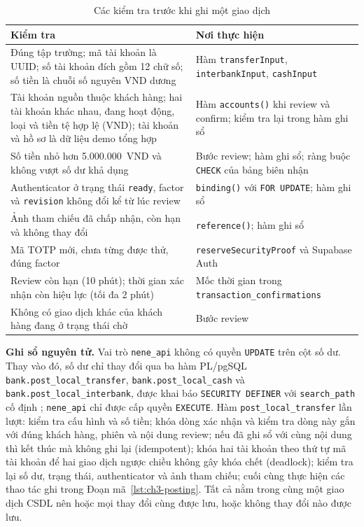 \begin{table}[H]
	\centering
	\caption{Các kiểm tra trước khi ghi một giao dịch}
	\label{tab:ch3-validation}
	\footnotesize
	\begin{tabularx}{\textwidth}{@{}X>{\raggedright\arraybackslash}p{5.6cm}@{}}
		\toprule
		\textbf{Kiểm tra} & \textbf{Nơi thực hiện}\\
		\midrule
		Đúng tập trường; mã tài khoản là UUID; số tài khoản đích gồm 12 chữ số; số tiền là chuỗi số nguyên VND dương & Hàm \texttt{transferInput}, \texttt{interbank\allowbreak{}Input}, \texttt{cashInput}\\
		Tài khoản nguồn thuộc khách hàng; hai tài khoản khác nhau, đang hoạt động, loại và tiền tệ hợp lệ (VND); tài khoản và hồ sơ là dữ liệu demo tổng hợp & Hàm \texttt{accounts()} khi review và confirm; kiểm tra lại trong hàm ghi sổ\\
		Số tiền nhỏ hơn 5.000.000~VND và không vượt số dư khả dụng & Bước review; hàm ghi sổ; ràng buộc \texttt{CHECK} của bảng biên nhận\\
		Authenticator ở trạng thái \texttt{ready}, factor và \texttt{revision} không đổi kể từ lúc review & \texttt{binding()} với \texttt{FOR UPDATE}; hàm ghi sổ\\
		Ảnh tham chiếu đã chấp nhận, còn hạn và không thay đổi & \texttt{reference()}; hàm ghi sổ\\
		Mã TOTP mới, chưa từng được thử, đúng factor & \texttt{reserve\allowbreak{}Security\allowbreak{}Proof} và Supabase Auth\\
		Review còn hạn (10 phút); thời gian xác nhận còn hiệu lực (tối đa 2 phút) & Mốc thời gian trong \texttt{transaction\_\allowbreak{}confirmations}\\
		Không có giao dịch khác của khách hàng đang ở trạng thái chờ & Bước review\\
		\bottomrule
	\end{tabularx}
\end{table}

\textbf{Ghi sổ nguyên tử.} Vai trò \texttt{nene\_\allowbreak{}api} không có quyền \texttt{UPDATE} trên cột số dư. Thay vào đó, số dư chỉ thay đổi qua ba hàm PL/pgSQL \texttt{bank.\allowbreak{}post\_\allowbreak{}local\_\allowbreak{}transfer}, \texttt{bank.\allowbreak{}post\_\allowbreak{}local\_\allowbreak{}cash} và \texttt{bank.\allowbreak{}post\_\allowbreak{}local\_\allowbreak{}interbank}, được khai báo \texttt{SECURITY DEFINER} với \texttt{search\_\allowbreak{}path} cố định \parencite{ch2-pg-create-function}; \texttt{nene\_\allowbreak{}api} chỉ được cấp quyền \texttt{EXECUTE}. Hàm \texttt{post\_\allowbreak{}local\_\allowbreak{}transfer} lần lượt: kiểm tra cấu hình và số tiền; khóa dòng xác nhận và kiểm tra dòng này gắn với đúng khách hàng, phiên và nội dung review; nếu đã ghi sổ với cùng nội dung thì kết thúc mà không ghi lại (idempotent); khóa hai tài khoản theo thứ tự mã tài khoản để hai giao dịch ngược chiều không gây khóa chết (deadlock); kiểm tra lại số dư, trạng thái, authenticator và ảnh tham chiếu; cuối cùng thực hiện các thao tác ghi trong Đoạn mã~\ref{lst:ch3-posting}. Tất cả nằm trong cùng một giao dịch CSDL nên hoặc mọi thay đổi cùng được lưu, hoặc không thay đổi nào được lưu.

